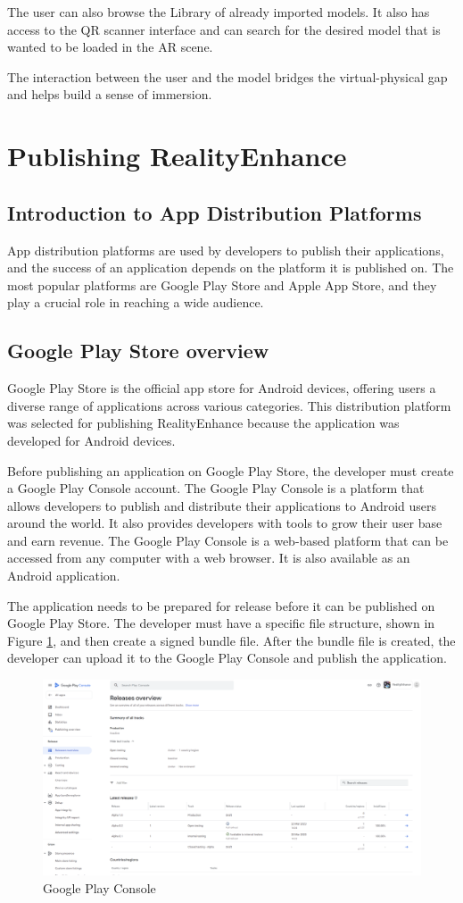 The user can also browse the Library of already imported models. It also has access to the \ac{QR} scanner interface and can search for the desired model that is wanted to be loaded in the \ac{AR} scene.

The interaction between the user and the model bridges the virtual-physical gap and helps build a sense of immersion.

\newpage
\section{Publishing RealityEnhance}
\subsection*{Introduction to App Distribution Platforms}
App distribution platforms are used by developers to publish their applications, and the success of an application depends on the platform it is published on. The most popular platforms are Google Play Store and Apple App Store, and they play a crucial role in reaching a wide audience.

\subsection*{Google Play Store overview}
Google Play Store is the official app store for Android devices\cite{GooglePlay}, offering users a diverse range of applications across various categories. This distribution platform was selected for publishing RealityEnhance because the application was developed for Android devices.

Before publishing an application on Google Play Store, the developer must create a Google Play Console account. The Google Play Console is a platform that allows developers to publish and distribute their applications to Android users around the world. It also provides developers with tools to grow their user base and earn revenue. The Google Play Console is a web-based platform that can be accessed from any computer with a web browser. It is also available as an Android application.

The application needs to be prepared for release before it can be published on Google Play Store. The developer must have a specific file structure, shown in Figure \ref{fig:GooglePlayConsole}, and then create a signed bundle file. After the bundle file is created, the developer can upload it to the Google Play Console and publish the application.

\begin{figure}[ht]
    \centering
    \includegraphics[width=1\textwidth]{img/GooglePlayConsole.png}
    \caption{Google Play Console}
    \label{fig:GooglePlayConsole}
\end{figure}